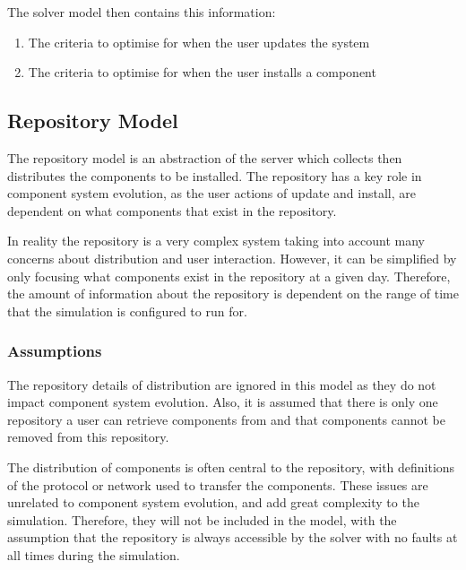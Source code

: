 The solver model then contains this information:
\begin{enumerate}
  \item The criteria to optimise for when the user updates the system
  \item The criteria to optimise for when the user installs a component
\end{enumerate}

\subsection{Repository Model}
The repository model is an abstraction of the server which collects then distributes the components to be installed.
The repository has a key role in component system evolution, 
as the user actions of update and install, are dependent on what components that exist in the repository.

In reality the repository is a very complex system taking into account many concerns about distribution and user interaction.
However, it can be simplified by only focusing what components exist in the repository at a given day. 
Therefore, the amount of information about the repository is dependent on the range of time that the simulation is configured to run for.

\subsubsection{Assumptions}
The repository details of distribution are ignored in this model as they do not impact component system evolution.
Also, it is assumed that there is only one repository a user can retrieve components from and that components cannot be removed from this repository.

The distribution of components is often central to the repository, 
with definitions of the protocol or network used to transfer the components.
These issues are unrelated to component system evolution, and add great complexity to the simulation.
Therefore, they will not be included in the model, with the assumption that the repository is always accessible by the solver with no faults at all times during the simulation.

